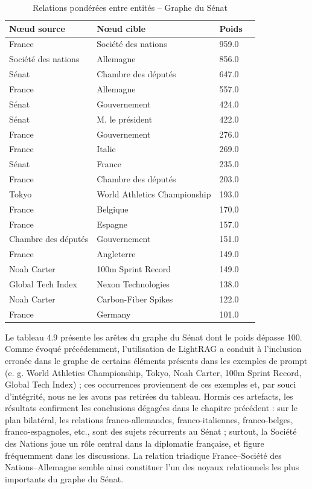 \documentclass[a4paper,twoside,12pt]{book}
\begin{document}
\begin{table}[ht]
\centering
\begin{tabular}{ll@{\hskip 1cm}ll}
\hline
\textbf{Nœud source} & \textbf{Nœud cible} & \textbf{Poids} \\
\hline
France & Société des nations & 959.0 \\
Société des nations & Allemagne & 856.0 \\
Sénat & Chambre des députés & 647.0 \\
France & Allemagne & 557.0 \\
Sénat & Gouvernement & 424.0 \\
Sénat & M. le président & 422.0 \\
France & Gouvernement & 276.0 \\
France & Italie & 269.0 \\
Sénat & France & 235.0 \\
France & Chambre des députés & 203.0 \\
Tokyo & World Athletics Championship & 193.0 \\
France & Belgique & 170.0 \\
France & Espagne & 157.0 \\
Chambre des députés & Gouvernement & 151.0 \\
France & Angleterre & 149.0 \\
Noah Carter & 100m Sprint Record & 149.0 \\
Global Tech Index & Nexon Technologies & 138.0 \\
Noah Carter & Carbon-Fiber Spikes & 122.0 \\
France & Germany & 101.0 \\
\hline
\end{tabular}
\caption{Relations pondérées entre entités – Graphe du Sénat}
\end{table}

Le tableau 4.9 présente les arêtes du graphe du Sénat dont le poids dépasse 100. Comme évoqué précédemment, l'utilisation de LightRAG a conduit à l'inclusion erronée dans le graphe de certains éléments présents dans les exemples de prompt (e. g. World Athletics Championship, Tokyo, Noah Carter, 100m Sprint Record, Global Tech Index) ; ces occurrences proviennent de ces exemples et, par souci d'intégrité, nous ne les avons pas retirées du tableau. Hormis ces artefacts, les résultats confirment les conclusions dégagées dans le chapitre précédent : sur le plan bilatéral, les relations franco-allemandes, franco-italiennes, franco-belges, franco-espagnoles, etc., sont des sujets récurrents au Sénat ; surtout, la Société des Nations joue un rôle central dans la diplomatie française, et figure fréquemment dans les discussions. La relation triadique France–Société des Nations–Allemagne semble ainsi constituer l'un des noyaux relationnels les plus importants du graphe du Sénat.
\end{document}
